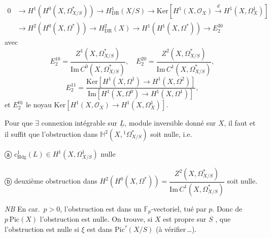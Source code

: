 \documentclass[11pt,a4paper]{article}
\begin{document}

\[
\begin{aligned}
0 &\to H^{1}(H^{0}(X, \Omega^{*}_{X/S})) \to H^{1}_{\mathrm{DR}}(X/S) \to \mathrm{Ker}[H^{1}(X, \mathcal{O}_{X}) \xrightarrow{d} H^{1}(X, \Omega^{1}_{X})] \\
&\to H^{2}(H^{0}(X, \Omega^{*})) \to H^{2}_{\mathrm{DR}}(X) \to H^{1}(H^{1}(X, \Omega^{*})) \to E^{30}_{2}
\end{aligned}
\]
avec
\[
E^{10}_{2} = \frac{Z^{1}(X, \Omega^{*}_{X/S})}{\mathrm{Im}\, C^{0}(X, \Omega^{*}_{X/S})}, \quad
E^{20}_{2} = \frac{Z^{2}(X, \Omega^{*}_{X/S})}{\mathrm{Im}\, C^{1}(X, \Omega^{*}_{X/S})},
\]
\[
E^{11}_{2} = \frac{\mathrm{Ker}[H^{1}(X, \Omega^{1}) \to H^{1}(X, \Omega^{2})]}{\mathrm{Im}[H^{1}(X, \Omega^{0}) \to H^{1}(X, \Omega^{1})]},
\]
et $E^{01}_{2}$ le noyau $\mathrm{Ker}[H^{1}(X, \mathcal{O}_{X}) \to H^{1}(X, \Omega^{1}_{X})]$.

Pour que $\exists$ connexion intégrable sur $\underline{L}$, module inversible donné sur $X$, il faut et il suffit que l'obstruction dans $\mathbb{H}^{2}(X, {}^{1}\Omega^{*}_{X/S})$ soit nulle, i.e.

ⓐ \struck{\ill{}} $c^{1}_{\mathrm{Hdg}}(L) \in H^{1}(X, \Omega^{1}_{X/S})$ nulle

ⓑ deuxième obstruction dans $H^{2}(H^{0}(X, \Omega^{*})) = \dfrac{Z^{2}(X, \Omega^{*}_{X/S})}{\mathrm{Im}\, C^{1}(X, \Omega^{*}_{X/S})}$ soit nulle.

\emph{NB} En car.\ $p > 0$, l'obstruction est dans un $\mathbb{F}_{p}$-vectoriel,  tué par $p$. Donc  \ill{} \ill{} de $p\,\mathrm{Pic}(X)$ l'obstruction est nulle. On trouve, si $X$ est propre sur $S$ , que l'obstruction est nulle  si $\xi$ est dans $\mathrm{Pic}^{\tau}(X/S)$ (à vérifier\,…).
\end{document}
